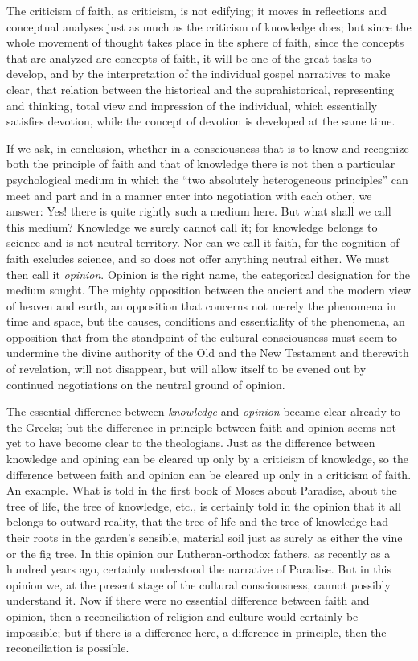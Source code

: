 \documentclass[12pt]{book}
\newcommand{\opage}[1]{\marginnote{\footnotesize\textit{[#1]}}}
\begin{document}
The criticism of faith, as criticism, is not edifying; it moves in reflections and conceptual analyses just as much as the criticism of knowledge does; but since the whole movement of thought takes place in the sphere of faith, since the concepts that are analyzed are concepts of faith, it will be one of the great tasks to develop, and by the interpretation of the individual gospel narratives to make clear, that relation between the historical and the suprahistorical, representing and thinking, total view and impression of the individual, which essentially satisfies devotion, while the concept of devotion is developed at the same time.

If we ask, in conclusion, whether in a consciousness that is to know and recognize both the principle of faith and that of knowledge there is not then a particular psychological medium in which the ``two absolutely heterogeneous principles'' can meet and part and in a manner enter into negotiation with each other, we answer: Yes! there is quite rightly such a medium here. But what shall we call this medium? Knowledge we surely cannot call it; for knowledge belongs to science and is not neutral territory. Nor can we call it faith, for the cognition of faith excludes science, and so does not offer anything neutral either. We must then call it \emph{opinion}. Opinion is the right name, the categorical designation for the medium sought. The mighty opposition between the ancient and the modern view of heaven and earth, an opposition that concerns not merely the phenomena in time and space, but the causes, conditions and essentiality of the phenomena, an opposition that from the standpoint of the cultural consciousness must seem to undermine the divine authority of the Old and the New Testament and therewith of revelation, will not disappear, but will allow itself to be evened out by continued negotiations on the neutral ground of opinion.

\opage{63}\setcounter{footnote}{0}%
The essential difference between \emph{knowledge} and \emph{opinion} became clear already to the Greeks; but the difference in principle between faith and opinion seems not yet to have become clear to the theologians. Just as the difference between knowledge and opining can be cleared up only by a criticism of knowledge, so the difference between faith and opinion can be cleared up only in a criticism of faith. An example. What is told in the first book of Moses about Paradise, about the tree of life, the tree of knowledge, etc., is certainly told in the opinion that it all belongs to outward reality, that the tree of life and the tree of knowledge had their roots in the garden's sensible, material soil just as surely as either the vine or the fig tree. In this opinion our Lutheran-orthodox fathers, as recently as a hundred years ago, certainly understood the narrative of Paradise. But in this opinion we, at the present stage of the cultural consciousness, cannot possibly understand it. Now if there were no essential difference between faith and opinion, then a reconciliation of religion and culture would certainly be impossible; but if there is a difference here, a difference in principle, then the reconciliation is possible.
\end{document}
